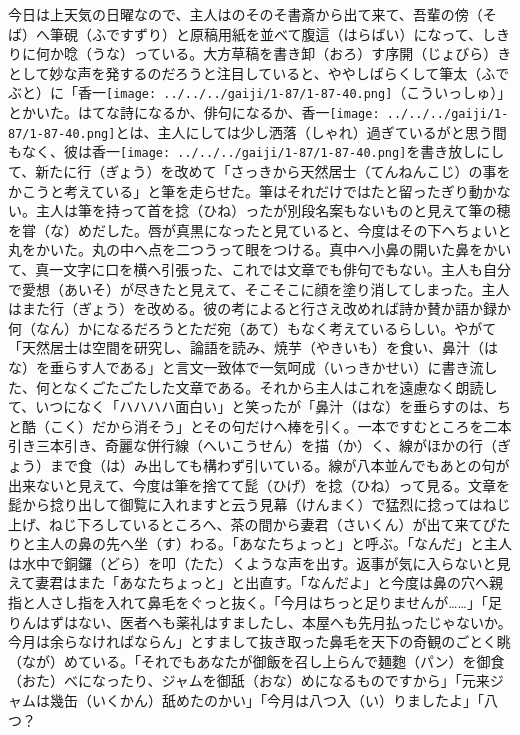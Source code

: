 \documentclass{book}
\begin{document}
今日は上天気の日曜なので、主人はのそのそ書斎から出て来て、吾輩の傍（そば）へ筆硯（ふですずり）と原稿用紙を並べて腹這（はらばい）になって、しきりに何か唸（うな）っている。大方草稿を書き卸（おろ）す序開（じょびら）きとして妙な声を発するのだろうと注目していると、ややしばらくして筆太（ふでぶと）に「香一\texttt{[image: ../../../gaiji/1-87/1-87-40.png]}（こういっしゅ）」とかいた。はてな詩になるか、俳句になるか、香一\texttt{[image: ../../../gaiji/1-87/1-87-40.png]}とは、主人にしては少し洒落（しゃれ）過ぎているがと思う間もなく、彼は香一\texttt{[image: ../../../gaiji/1-87/1-87-40.png]}を書き放しにして、新たに行（ぎょう）を改めて「さっきから天然居士（てんねんこじ）の事をかこうと考えている」と筆を走らせた。筆はそれだけではたと留ったぎり動かない。主人は筆を持って首を捻（ひね）ったが別段名案もないものと見えて筆の穂を甞（な）めだした。唇が真黒になったと見ていると、今度はその下へちょいと丸をかいた。丸の中へ点を二つうって眼をつける。真中へ小鼻の開いた鼻をかいて、真一文字に口を横へ引張った、これでは文章でも俳句でもない。主人も自分で愛想（あいそ）が尽きたと見えて、そこそこに顔を塗り消してしまった。主人はまた行（ぎょう）を改める。彼の考によると行さえ改めれば詩か賛か語か録か何（なん）かになるだろうとただ宛（あて）もなく考えているらしい。やがて「天然居士は空間を研究し、論語を読み、焼芋（やきいも）を食い、鼻汁（はな）を垂らす人である」と言文一致体で一気呵成（いっきかせい）に書き流した、何となくごたごたした文章である。それから主人はこれを遠慮なく朗読して、いつになく「ハハハハ面白い」と笑ったが「鼻汁（はな）を垂らすのは、ちと酷（こく）だから消そう」とその句だけへ棒を引く。一本ですむところを二本引き三本引き、奇麗な併行線（へいこうせん）を描（か）く、線がほかの行（ぎょう）まで食（は）み出しても構わず引いている。線が八本並んでもあとの句が出来ないと見えて、今度は筆を捨てて髭（ひげ）を捻（ひね）って見る。文章を髭から捻り出して御覧に入れますと云う見幕（けんまく）で猛烈に捻ってはねじ上げ、ねじ下ろしているところへ、茶の間から妻君（さいくん）が出て来てぴたりと主人の鼻の先へ坐（す）わる。「あなたちょっと」と呼ぶ。「なんだ」と主人は水中で銅鑼（どら）を叩（たた）くような声を出す。返事が気に入らないと見えて妻君はまた「あなたちょっと」と出直す。「なんだよ」と今度は鼻の穴へ親指と人さし指を入れて鼻毛をぐっと抜く。「今月はちっと足りませんが\ldots{}\ldots{}」「足りんはずはない、医者へも薬礼はすましたし、本屋へも先月払ったじゃないか。今月は余らなければならん」とすまして抜き取った鼻毛を天下の奇観のごとく眺（なが）めている。「それでもあなたが御飯を召し上らんで麺麭（パン）を御食（おた）べになったり、ジャムを御舐（おな）めになるものですから」「元来ジャムは幾缶（いくかん）舐めたのかい」「今月は八つ入（い）りましたよ」「八つ？ 
\end{document}

